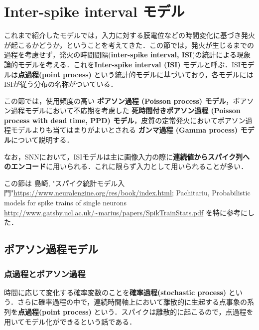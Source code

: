 \section{Inter-spike interval モデル}
これまで紹介したモデルでは，入力に対する膜電位などの時間変化に基づき発火が起こるかどうか，ということを考えてきた．この節では，発火が生じるまでの過程を考慮せず，発火の時間間隔(\textbf{inter-spike interval, ISI})の統計による現象論的モデルを考える．これを\textbf{Inter-spike interval (ISI)} モデルと呼ぶ．ISIモデルは\textbf{点過程(point process)} という統計的モデルに基づいており，各モデルにはISIが従う分布の名称がついている．

この節では，使用頻度の高い \textbf{ポアソン過程 (Poisson process) モデル}，ポアソン過程モデルにおいて不応期を考慮した \textbf{死時間付きポアソン過程 (Poisson process with dead time, PPD) モデル}，皮質の定常発火においてポアソン過程モデルよりも当てはまりがよいとされる \textbf{ガンマ過程 (Gamma process) モデル}について説明する．

なお，SNNにおいて，ISIモデルは主に画像入力の際に\textbf{連続値からスパイク列へのエンコード}に用いられる．これに限らず入力として用いられることが多い．


この節は 島崎, "スパイク統計モデル入門"\url{https://www.neuralengine.org/res/book/index.html}; Pachitariu, Probabilistic models for spike trains of single neurons \url{http://www.gatsby.ucl.ac.uk/~marius/papers/SpikTrainStats.pdf} を特に参考にした．
\subsection{ポアソン過程モデル}
\subsubsection{点過程とポアソン過程}
時間に応じて変化する確率変数のことを\textbf{確率過程(stochastic process)} という．さらに確率過程の中で，連続時間軸上において離散的に生起する点事象の系列を\textbf{点過程(point process)} という．スパイクは離散的に起こるので，点過程を用いてモデル化ができるという話である．

